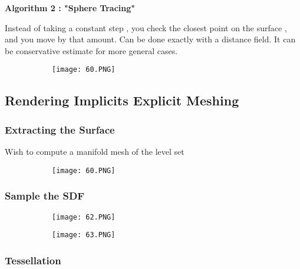 \documentclass{article}
\begin{document}
\textbf{Algorithm 2 : "Sphere Tracing"}

Instead of taking a constant step , you check the closest point on the surface , and you move by that amount.
Can be done exactly with a distance field. It can be conservative estimate for more general cases.

\begin{figure}[ht!]
  \centering
  \begin{subfigure}[b]{0.4\linewidth}
    \texttt{[image: 60.PNG]}
  \end{subfigure}
\end{figure}



\subsection{Rendering Implicits Explicit Meshing}
\subsubsection{Extracting the Surface}

Wish to compute a manifold mesh of the level set

\begin{figure}[ht!]
  \centering
  \begin{subfigure}[b]{0.4\linewidth}
    \texttt{[image: 60.PNG]}
  \end{subfigure}
\end{figure}

\subsubsection{Sample the SDF}

\begin{figure}[ht!]
  \centering
  \begin{subfigure}[b]{0.29\linewidth}
    \texttt{[image: 62.PNG]}
  \end{subfigure}
  \begin{subfigure}[b]{0.3\textwidth}
         \centering
         \texttt{[image: 63.PNG]}
     \end{subfigure}
\end{figure}

\subsubsection{Tessellation}
\end{document}
